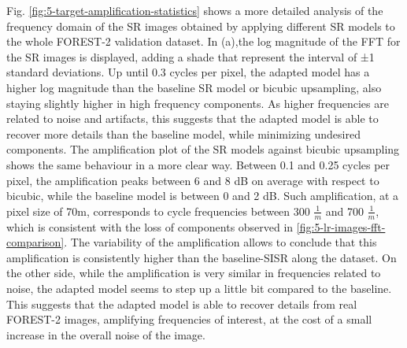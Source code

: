         Fig. \ref{fig:5-target-amplification-statistics} shows a more detailed analysis of the frequency domain of the SR images obtained by applying different SR models to the whole FOREST-2 validation dataset.
        In (a),the log magnitude of the FFT for the SR images is displayed, adding a shade that represent the interval of ±1 standard deviations. 
        Up until 0.3 cycles per pixel, the adapted model has a higher log magnitude than the baseline SR model or bicubic upsampling, also staying slightly higher in high frequency components.
        As higher frequencies are related to noise and artifacts, this suggests that the adapted model is able to recover more details than the baseline model, while minimizing undesired components.
        The amplification plot of the SR models against bicubic upsampling shows the same behaviour in a more clear way. Between 0.1 and 0.25 cycles per pixel, the amplification peaks  between 6 and 8 dB on average with respect to bicubic, while the baseline model is between 0 and 2 dB.
        Such amplification, at a pixel size of 70m, corresponds to cycle frequencies between  300 $\frac{1}{m}$ and 700 $\frac{1}{m}$, which is consistent with the loss of components observed in \ref{fig:5-lr-images-fft-comparison}.
        The variability of the amplification allows to conclude that this amplification is consistently higher than the baseline-SISR along the dataset.
        On the other side, while the amplification is very similar in frequencies related to noise, the adapted model seems to step up a little bit compared to the baseline.  
        This suggests that the adapted model is able to recover details from real FOREST-2 images, amplifying frequencies of interest, at the cost of a small increase in the overall noise of the image.

